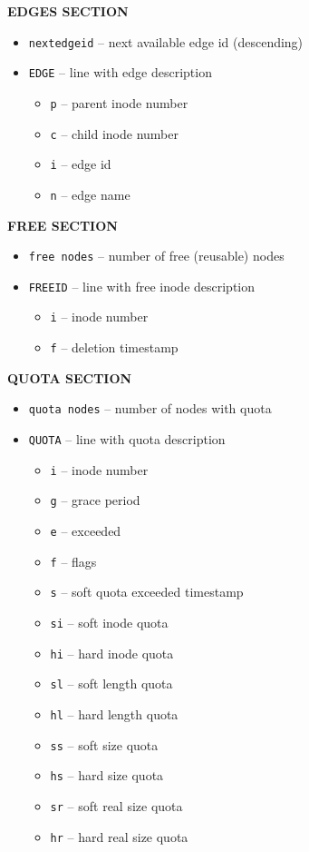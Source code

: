 \documentclass[a4paper,11pt,english]{report}
\def\code#1{\texttt{#1}}
\begin{document}
				\textbf{EDGES SECTION}
				\begin{itemize}
					\item \code{nextedgeid}          -- next available edge id (descending)
					\item \code{EDGE}      -- line with edge description
					\begin{itemize}
						\item \code{p}      -- parent inode number
						\item \code{c}      -- child inode number
						\item \code{i}      -- edge id
						\item \code{n}      -- edge name
					\end{itemize}
				\end{itemize}
				\bigskip
				
				\textbf{FREE SECTION}
				\begin{itemize}
					\item \code{free nodes}          -- number of free (reusable) nodes
					\item \code{FREEID}    -- line with free inode description
					\begin{itemize}
						\item \code{i}      -- inode number
						\item \code{f}      -- deletion timestamp
					\end{itemize}
				\end{itemize}
				\bigskip
				
				\textbf{QUOTA SECTION}
				\begin{itemize}
					\item \code{quota nodes}         -- number of nodes with quota
					\item \code{QUOTA}     -- line with quota description
					\begin{itemize}
						\item \code{i}      -- inode number
						\item \code{g}      -- grace period
						\item \code{e}      -- exceeded
						\item \code{f}      -- flags
						\item \code{s}      -- soft quota exceeded timestamp
						\item \code{si}     -- soft inode quota
						\item \code{hi}     -- hard inode quota
						\item \code{sl}     -- soft length quota
						\item \code{hl}     -- hard length quota
						\item \code{ss}     -- soft size quota
						\item \code{hs}     -- hard size quota
						\item \code{sr}     -- soft real size quota
						\item \code{hr}     -- hard real size quota
					\end{itemize}
				\end{itemize}
				\bigskip
				
\end{document}
